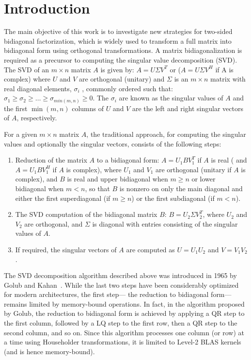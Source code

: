 \section{Introduction}
The main objective of this work is to investigate new strategies for
two-sided bidiagonal factorization,
which is widely used to
transform a full matrix into bidiagonal form using orthogonal transformations.
A matrix bidiagonalization is required as a precursor to computing the
singular value decomposition (SVD).
The SVD of an $m\times n$ matrix $A$ is given by:
$A = U \Sigma V^T$ or ($A = U \Sigma V^H$ if A is complex) where
$U$ and $V$ are orthogonal (unitary) and $\Sigma$ is an $m\times n$
matrix with real diagonal elements, $\sigma_i$ , commonly ordered such
that: $\sigma_1 \ge \sigma_2 \ge \dots \ge \sigma_{min(m,n)} \ge 0.$
The $\sigma_i$ are known as the singular values of $A$
and the first $\min(m, n)$ columns
of $U$ and $V$ are the left and right singular vectors of $A$, respectively.

For a given $m\times n$ matrix $A$,
the traditional approach, for computing the singular
values and optionally the singular vectors,
consists of the following steps:
\begin{enumerate}
\item Reduction of the matrix $A$ to a bidiagonal form:
$A = U_1BV^T_1$ if $A$ is real ( and $A = U_1BV^H_1$ if $A$ is complex), where
  $U_1$ and $V_1$ are orthogonal (unitary if $A$ is complex), and $B$ is
  real and upper bidiagonal when $m \ge n$ or lower bidiagonal when $m < n$,
  so that $B$ is nonzero on only the main diagonal and either the first
  superdiagonal (if $m \ge n$) or the first subdiagonal (if $m < n$).

\item The SVD computation of the bidiagonal matrix $B$: $B = U_2 \Sigma
  V_2^T$, where $U_2$ and $V_2$ are orthogonal, and $\Sigma$ is
  diagonal with entries consisting of the singular values of $A$.
\item If required, the singular vectors of $A$ are computed as
  $U = U_1U_2$ and $V = V_1 V_2$.
\end{enumerate}

The SVD decomposition algorithm described above was introduced in
1965 by Golub and Kahan~\cite{golub1965calculating}.
While the last two steps have been considerably optimized
for modern architectures,
the first step---%
the reduction to bidiagonal form---%
remains limited by
memory-bound operations.
In fact, in the algorithm proposed by Golub,
the reduction to bidiagonal form is achieved by applying a QR step to
the first column, followed by a LQ step to the first row, then a QR
step to the second column, and so on. Since this algorithm processes
one column (or row) at a time using Householder transformations,
it is limited to Level-2 BLAS kernels (and is hence memory-bound).


